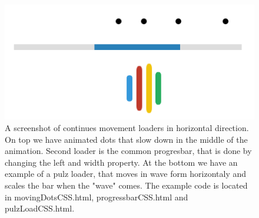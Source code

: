 \begin{figure}[tp]
\centering
\includegraphics[keepaspectratio,width=\hsize,height=\halfh]
{images/horizontalLoad.png}

\caption[Continues Horizontal Movement Loading]{
A screenshot of continues movement loaders in horizontal direction. On top we 
have animated dots that slow down in the middle of the animation. Second loader 
is the common progresbar, that is done by changing the left and width property. 
At the bottom we have an example of a pulz loader, that moves in wave form 
horizontaly and scales the bar when the "wave" comes. The example code is 
located in movingDotsCSS.html, progressbarCSS.html and pulzLoadCSS.html.
}
\label{fig:horizontalLoad}
\end{figure}

